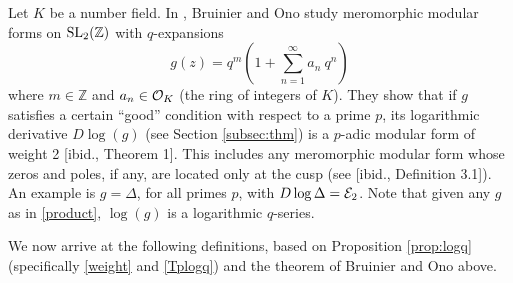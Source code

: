 \documentclass{gtpart}
\theoremstyle{definition}
\theoremstyle{remark}
\newcommand{\mb}[1]{\mathbb{#1}}
\newcommand{\CE}{{\cal E}}
\newcommand{\CO}{{\cal O}}
\newcommand{\BZ}{{\mb Z}}
\renewcommand{\D}{\Delta}
\renewcommand{\=}{\approx}
\renewcommand{\-}{\sim}
\newcommand{\SL}{{\rm SL}}
\numberwithin{equation}{section}
\numberwithin{thm}{section}
\begin{document}
Let $K$ be a number field.  
In \cite{BruinierOno}, Bruinier and Ono study meromorphic modular forms on $\SL_2(\BZ)$ with $q$-expansions 
\begin{equation}
 \label{product}
 g(z) = q^m \left( 1 + \sum_{n=1}^\infty a_n ~\! q^n \right) 
\end{equation}
where $m \in \BZ$ and $a_n \in \CO_K$ (the ring of integers of $K$).  
They show that if $g$ satisfies a certain ``good'' condition with respect to a prime $p$, 
its logarithmic derivative $D \log(g)$ (see Section \ref{subsec:thm}) 
is a $p$-adic modular form of weight 2 [ibid., Theorem 1].  
This includes any meromorphic modular form whose zeros and poles, if any, are located only at the cusp (see [ibid., Definition 3.1]).  
An example is $g = \D$, for all primes $p$, with $D \log \D = \CE_2$.  
Note that given any $g$ as in \eqref{product}, $\log(g)$ is a logarithmic $q$-series.  

We now arrive at the following definitions, 
based on Proposition \ref{prop:logq} (specifically \eqref{weight} and \eqref{Tplogq}) 
and the theorem of Bruinier and Ono above.  
\end{document}
